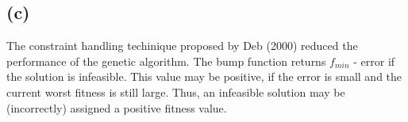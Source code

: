 \documentclass[12pt]{article}
\begin{document}
\subsection{(c)}
The constraint handling techinique proposed by Deb (2000) reduced the performance of the genetic algorithm. The bump function returns $f_{min}$ - error if the solution is infeasible. This value may be positive, if the error is small and the current worst fitness is still large. Thus, an infeasible solution may be (incorrectly) assigned a positive fitness value.
\end{document}
